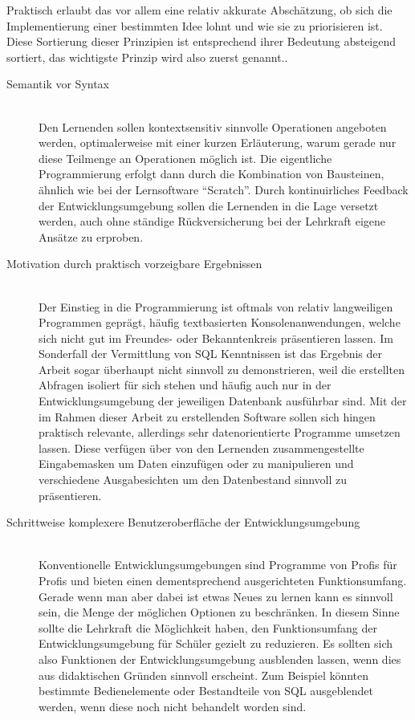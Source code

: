 Praktisch erlaubt das vor allem eine relativ akkurate Abschätzung, ob sich die Implementierung einer bestimmten Idee lohnt und wie sie zu priorisieren ist. Diese Sortierung dieser Prinzipien ist entsprechend ihrer Bedeutung absteigend sortiert, das wichtigste Prinzip wird also zuerst genannt..

\begin{description}
\item[Semantik vor Syntax] \hfill\\
  Den Lernenden sollen kontextsensitiv sinnvolle Operationen angeboten werden, optimalerweise mit einer kurzen Erläuterung, warum gerade nur diese Teilmenge an Operationen möglich ist. Die eigentliche Programmierung erfolgt dann durch die Kombination von Bausteinen, ähnlich wie bei der Lernsoftware ``Scratch''. Durch kontinuirliches Feedback der Entwicklungsumgebung sollen die Lernenden in die Lage versetzt werden, auch ohne ständige Rückversicherung bei der Lehrkraft eigene Ansätze zu erproben.
\item[Motivation durch praktisch vorzeigbare Ergebnissen] \hfill\\
  Der Einstieg in die Programmierung ist oftmals von relativ langweiligen Programmen geprägt, häufig textbasierten Konsolenanwendungen, welche sich nicht gut im Freundes- oder Bekanntenkreis präsentieren lassen. Im Sonderfall der Vermittlung von SQL Kenntnissen ist das Ergebnis der Arbeit sogar überhaupt nicht sinnvoll zu demonstrieren, weil die erstellten Abfragen isoliert für sich stehen und häufig auch nur in der Entwicklungsumgebung der jeweiligen Datenbank ausführbar sind. Mit der im Rahmen dieser Arbeit zu erstellenden Software sollen sich hingen praktisch relevante, allerdings sehr datenorientierte Programme umsetzen lassen. Diese verfügen über von den Lernenden zusammengestellte Eingabemasken um Daten einzufügen oder zu manipulieren und verschiedene Ausgabesichten um den Datenbestand sinnvoll zu präsentieren.
\item[Schrittweise komplexere Benutzeroberfläche der Entwicklungsumgebung] \hfill \\
  Konventionelle Entwicklungsumgebungen sind Programme von Profis für Profis und bieten einen dementsprechend ausgerichteten Funktionsumfang. Gerade wenn man aber dabei ist etwas Neues zu lernen kann es sinnvoll sein, die Menge der möglichen Optionen zu beschränken. In diesem Sinne sollte die Lehrkraft die Möglichkeit haben, den Funktionsumfang der Entwicklungsumgebung für Schüler gezielt zu reduzieren. Es sollten sich also Funktionen der Entwicklungsumgebung ausblenden lassen, wenn dies aus didaktischen Gründen sinnvoll erscheint. Zum Beispiel könnten bestimmte Bedienelemente oder Bestandteile von SQL ausgeblendet werden, wenn diese noch nicht behandelt worden sind.

\end{description}
